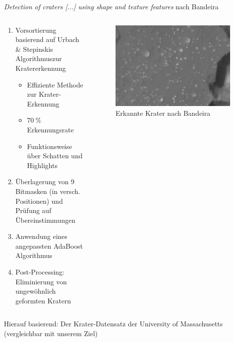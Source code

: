 \documentclass[9pt]{beamer}
\begin{document}
\begin{frame}{\textit{Detection of craters [...] using shape and texture features} nach Bandeira\footnotemark[1]}
\begin{columns}
	\begin{column}{.5\textwidth}
		\begin{enumerate}
		\item Vorsortierung basierend auf Urbach \& Stepinskis Algorithmus\footnotemark[2] zur Kratererkennung
		\begin{itemize}
			\item Effiziente Methode zur Krater-Erkennung
			\item $\SI{70}{\percent}$ Erkennungsrate
			\item Funktionsweise über Schatten und Highlights
		\end{itemize}
		\item Überlagerung von 9 Bitmasken (in versch. Positionen) und Prüfung auf Übereinstimmungen
		\item Anwendung eines angepassten AdaBoost Algorithmus
		\item Post-Processing: Eliminierung von ungewöhnlich geformten Kratern
		\end{enumerate}
	\end{column}
	\begin{column}{.5\textwidth}
		\begin{figure}[H]
			\includegraphics[width=\textwidth, keepaspectratio]{bandeira_detected.png}
			\caption{Erkannte Krater nach Bandeira}
		\end{figure}
	\end{column}
\end{columns}
\bigskip
\begin{center}Hierauf basierend: Der Krater-Datensatz der University of Massachusetts\footnotemark[3]\\
	(vergleichbar mit unserem Ziel)
\end{center}

\end{frame}
\end{document}

